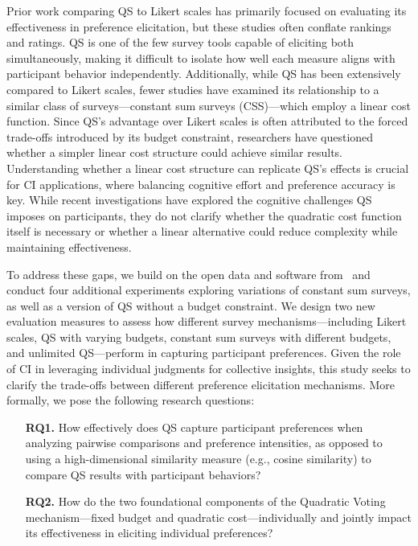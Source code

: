 Prior work comparing QS to Likert scales has primarily focused on evaluating its effectiveness in preference elicitation, but these studies often conflate rankings and ratings. QS is one of the few survey tools capable of eliciting both simultaneously, making it difficult to isolate how well each measure aligns with participant behavior independently. Additionally, while QS has been extensively compared to Likert scales, fewer studies have examined its relationship to a similar class of surveys—constant sum surveys (CSS)—which employ a linear cost function. Since QS's advantage over Likert scales is often attributed to the forced trade-offs introduced by its budget constraint, researchers have questioned whether a simpler linear cost structure could achieve similar results. Understanding whether a linear cost structure can replicate QS's effects is crucial for CI applications, where balancing cognitive effort and preference accuracy is key. While recent investigations have explored the cognitive challenges QS imposes on participants, they do not clarify whether the quadratic cost function itself is necessary or whether a linear alternative could reduce complexity while maintaining effectiveness.



To address these gaps, we build on the open data and software from~\citet{chengCanShowWhat2021} and conduct four additional experiments exploring variations of constant sum surveys, as well as a version of QS without a budget constraint. We design two new evaluation measures to assess how different survey mechanisms—including Likert scales, QS with varying budgets, constant sum surveys with different budgets, and unlimited QS—perform in capturing participant preferences. Given the role of CI in leveraging individual judgments for collective insights, this study seeks to clarify the trade-offs between different preference elicitation mechanisms. More formally, we pose the following research questions:

\begin{itemize}
\item [\textbf{RQ1.}] How effectively does QS capture participant preferences when analyzing pairwise comparisons and preference intensities, as opposed to using a high-dimensional similarity measure (e.g., cosine similarity) to compare QS results with participant behaviors?
\item [\textbf{RQ2.}] How do the two foundational components of the Quadratic Voting mechanism—fixed budget and quadratic cost—individually and jointly impact its effectiveness in eliciting individual preferences?
\end{itemize}

